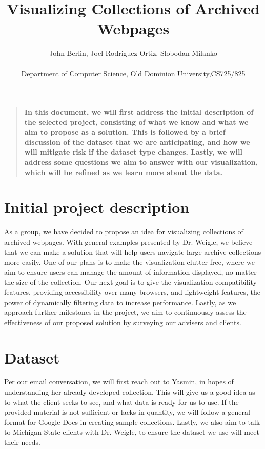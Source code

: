 \documentclass[12pt]{article}
\title{Visualizing Collections of Archived Webpages}
\author
{John Berlin, Joel Rodriguez-Ortiz, Slobodan Milanko\\
\\
\normalsize{Department of Computer Science, Old Dominion University,CS725/825}\\
}
\date{}
\newenvironment{sciabstract}{%
\begin{quote} \bf}
{\end{quote}}
\begin{document}
 
\baselineskip24pt
\maketitle 

\begin{sciabstract}
  In this document, we will first address the initial description of the selected project, consisting of what we know and what we aim to propose as a solution. This is followed by a brief discussion of the dataset that we are anticipating, and how we will mitigate risk if the dataset type changes. Lastly, we will address some questions we aim to answer with our visualization, which will be refined as we learn more about the data.
  
\end{sciabstract}


\section*{Initial project description}

As a group, we have decided to propose an idea for visualizing collections of archived webpages. With general examples presented by Dr. Weigle, we believe that we can make a solution that will help users navigate large archive collections more easily. One of our plans is to make the visualization clutter free, where we aim to ensure users can manage the amount of information displayed, no matter the size of the collection. Our next goal is to give the visualization compatibility features, providing accessibility over many browsers, and lightweight features, the power of dynamically filtering data to increase performance. Lastly, as we approach further milestones in the project, we aim to continuously assess the effectiveness of our proposed solution by surveying our advisers and clients.

\section*{Dataset}

Per our email conversation, we will first reach out to Yasmin, in hopes of understanding her already developed collection. This will give us a good idea as to what the client seeks to see, and what data is ready for us to use. If the provided material is not sufficient or lacks in quantity, we will follow a general format for Google Docs in creating sample collections. Lastly, we also aim to talk to Michigan State clients with Dr. Weigle, to ensure the dataset we use will meet their needs.
\end{document}

